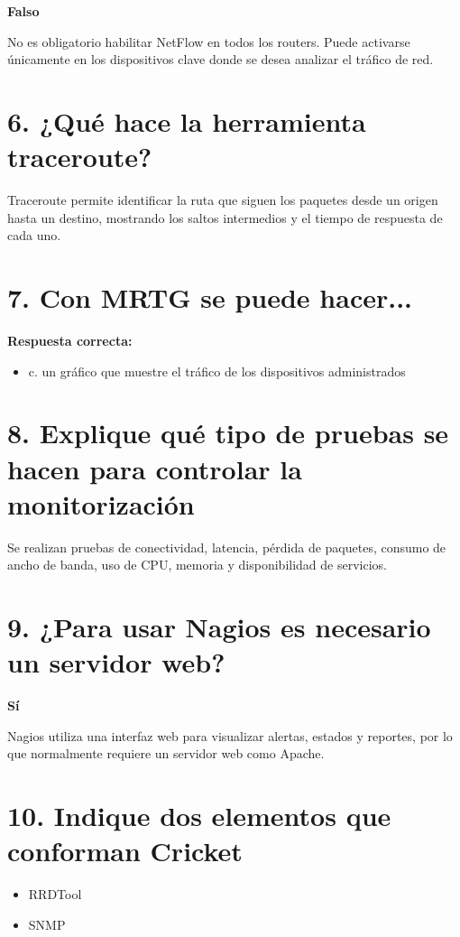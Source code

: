 \documentclass[12pt]{article}
\begin{document}
\textbf{Falso}

No es obligatorio habilitar NetFlow en todos los routers. Puede activarse únicamente en los dispositivos clave donde se desea analizar el tráfico de red.

\section*{6. ¿Qué hace la herramienta traceroute?}

Traceroute permite identificar la ruta que siguen los paquetes desde un origen hasta un destino, mostrando los saltos intermedios y el tiempo de respuesta de cada uno.

\section*{7. Con MRTG se puede hacer...}

\textbf{Respuesta correcta:}

\begin{itemize}
    \item c. un gráfico que muestre el tráfico de los dispositivos administrados
\end{itemize}

\section*{8. Explique qué tipo de pruebas se hacen para controlar la monitorización}

Se realizan pruebas de conectividad, latencia, pérdida de paquetes, consumo de ancho de banda, uso de CPU, memoria y disponibilidad de servicios.

\section*{9. ¿Para usar Nagios es necesario un servidor web?}

\textbf{Sí}

Nagios utiliza una interfaz web para visualizar alertas, estados y reportes, por lo que normalmente requiere un servidor web como Apache.

\section*{10. Indique dos elementos que conforman Cricket}

\begin{itemize}
    \item RRDTool
    \item SNMP
\end{itemize}
\end{document}
